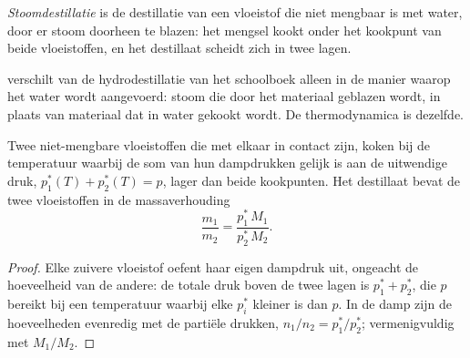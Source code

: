 \begin{definition}[Stoomdestillatie]\label{def:b2:liquid-vapour-diagrams:steam-distillation}
\emph{Stoomdestillatie} is de destillatie van een
vloeistof die niet mengbaar is met water, door er stoom doorheen te blazen: het mengsel kookt
onder het kookpunt van beide vloeistoffen, en het destillaat scheidt zich in
twee lagen.
\end{definition}

 verschilt van de hydrodestillatie van het schoolboek
alleen in de manier waarop het water wordt aangevoerd: stoom die door het materiaal geblazen wordt, in plaats
van materiaal dat in water gekookt wordt. De thermodynamica is dezelfde.

\begin{proposition}\label{prop:b2:liquid-vapour-diagrams:steam}
Twee niet-mengbare vloeistoffen die met elkaar in contact zijn, koken bij de temperatuur waarbij de som van
hun dampdrukken gelijk is aan de uitwendige druk, $p_1^*(T) + p_2^*(T) =
p$, lager dan beide kookpunten. Het destillaat bevat de twee vloeistoffen
in de massaverhouding
\[
  \frac{m_1}{m_2} = \frac{p_1^*\,M_1}{p_2^*\,M_2} .
\]
\end{proposition}

\begin{proof}
Elke zuivere vloeistof oefent haar eigen dampdruk uit, ongeacht de hoeveelheid van de
andere: de totale druk boven de twee lagen is $p_1^* + p_2^*$, die
$p$ bereikt bij een temperatuur waarbij elke $p_i^*$ kleiner is dan $p$. In de
damp zijn de hoeveelheden evenredig met de partiële drukken, $n_1/n_2 =
p_1^*/p_2^*$; vermenigvuldig met $M_1/M_2$.
\end{proof}

